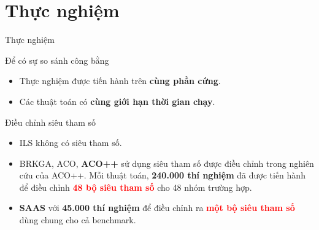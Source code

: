 \documentclass[aspectratio=169]{beamer}
\begin{document}
\section{Thực nghiệm}
\begin{frame}{Thực nghiệm}
    \vspace{-0.3cm}
    \begin{block}{Để có sự so sánh công bằng}
    \begin{itemize}
        \item Thực nghiệm được tiến hành trên \textbf{cùng phần cứng}.
        \item Các thuật toán có \textbf{cùng giới hạn thời gian chạy}.
    \end{itemize}
    \end{block}
    \begin{block}{Điều chỉnh siêu tham số}
        \begin{itemize}
        \justifying
            \vspace{0.1cm}
            \item ILS không có siêu tham số.
            \vspace{0.1cm}
            \item BRKGA, ACO, \textbf{ACO++} sử dụng siêu tham số được điều chỉnh trong nghiên cứu của ACO++. Mỗi thuật toán, \textbf{240.000 thí nghiệm} đã được tiến hành để điều chỉnh \textbf{\textcolor{red}{48 bộ siêu tham số}} cho 48 nhóm trường hợp.
            \vspace{0.1cm}
            \item \textbf{SAAS} với \textbf{45.000 thí nghiệm} để điều chỉnh ra \textbf{\textcolor{red}{một bộ siêu tham số}} dùng chung cho cả benchmark.
            \vspace{0.1cm}
        \end{itemize}
    \end{block}
\end{frame}
\end{document}
